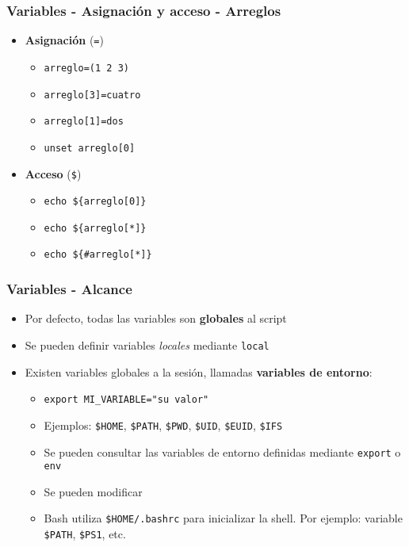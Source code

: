 \begin{frame}
  \frametitle{Variables - Asignación y acceso - Arreglos}
  \begin{itemize}
    \item \textbf{Asignación} (\texttt{=})
    \begin{itemize}
      \item \texttt{arreglo=(1 2 3)}
      \item \texttt{arreglo[3]=cuatro}
      \item \texttt{arreglo[1]=dos}
      \item \texttt{unset arreglo[0]}
    \end{itemize}
    \item \textbf{Acceso} (\texttt{\${}})
    \begin{itemize}
      \item \texttt{echo \$\{arreglo[0]\}}
      \item \texttt{echo \$\{arreglo[*]\}}
      \item \texttt{echo \$\{\#arreglo[*]\}}
    \end{itemize}
  \end{itemize}
\end{frame}

\begin{frame}
  \frametitle{Variables - Alcance}
  \begin{itemize}
    \item Por defecto, todas las variables son \textbf{globales} al script
    \item Se pueden definir variables \textit{locales} mediante \texttt{local}
    \item Existen variables globales a la sesión, llamadas \textbf{variables de entorno}:
    \begin{itemize}
      \item \texttt{export MI\_VARIABLE=\string"su valor\string"}
      \item Ejemplos: \texttt{\$HOME}, \texttt{\$PATH}, \texttt{\$PWD}, \texttt{\$UID}, \texttt{\$EUID}, \texttt{\$IFS}
      \item Se pueden consultar las variables de entorno definidas mediante \texttt{export} o \texttt{env}
      \item Se pueden modificar
      \item Bash utiliza \texttt{\$HOME/.bashrc} para inicializar la shell. Por ejemplo: variable \texttt{\$PATH}, \texttt{\$PS1}, etc.
    \end{itemize}
  \end{itemize}
\end{frame}

